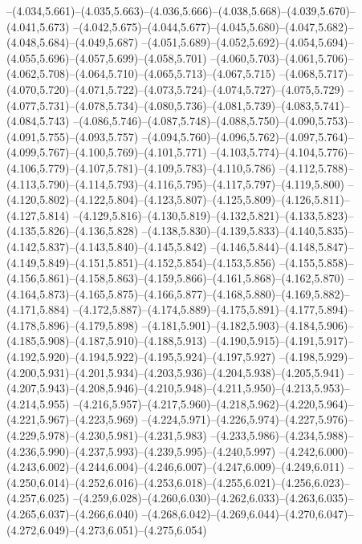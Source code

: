   --(4.034,5.661)--(4.035,5.663)--(4.036,5.666)--(4.038,5.668)--(4.039,5.670)--(4.041,5.673)%
  --(4.042,5.675)--(4.044,5.677)--(4.045,5.680)--(4.047,5.682)--(4.048,5.684)--(4.049,5.687)%
  --(4.051,5.689)--(4.052,5.692)--(4.054,5.694)--(4.055,5.696)--(4.057,5.699)--(4.058,5.701)%
  --(4.060,5.703)--(4.061,5.706)--(4.062,5.708)--(4.064,5.710)--(4.065,5.713)--(4.067,5.715)%
  --(4.068,5.717)--(4.070,5.720)--(4.071,5.722)--(4.073,5.724)--(4.074,5.727)--(4.075,5.729)%
  --(4.077,5.731)--(4.078,5.734)--(4.080,5.736)--(4.081,5.739)--(4.083,5.741)--(4.084,5.743)%
  --(4.086,5.746)--(4.087,5.748)--(4.088,5.750)--(4.090,5.753)--(4.091,5.755)--(4.093,5.757)%
  --(4.094,5.760)--(4.096,5.762)--(4.097,5.764)--(4.099,5.767)--(4.100,5.769)--(4.101,5.771)%
  --(4.103,5.774)--(4.104,5.776)--(4.106,5.779)--(4.107,5.781)--(4.109,5.783)--(4.110,5.786)%
  --(4.112,5.788)--(4.113,5.790)--(4.114,5.793)--(4.116,5.795)--(4.117,5.797)--(4.119,5.800)%
  --(4.120,5.802)--(4.122,5.804)--(4.123,5.807)--(4.125,5.809)--(4.126,5.811)--(4.127,5.814)%
  --(4.129,5.816)--(4.130,5.819)--(4.132,5.821)--(4.133,5.823)--(4.135,5.826)--(4.136,5.828)%
  --(4.138,5.830)--(4.139,5.833)--(4.140,5.835)--(4.142,5.837)--(4.143,5.840)--(4.145,5.842)%
  --(4.146,5.844)--(4.148,5.847)--(4.149,5.849)--(4.151,5.851)--(4.152,5.854)--(4.153,5.856)%
  --(4.155,5.858)--(4.156,5.861)--(4.158,5.863)--(4.159,5.866)--(4.161,5.868)--(4.162,5.870)%
  --(4.164,5.873)--(4.165,5.875)--(4.166,5.877)--(4.168,5.880)--(4.169,5.882)--(4.171,5.884)%
  --(4.172,5.887)--(4.174,5.889)--(4.175,5.891)--(4.177,5.894)--(4.178,5.896)--(4.179,5.898)%
  --(4.181,5.901)--(4.182,5.903)--(4.184,5.906)--(4.185,5.908)--(4.187,5.910)--(4.188,5.913)%
  --(4.190,5.915)--(4.191,5.917)--(4.192,5.920)--(4.194,5.922)--(4.195,5.924)--(4.197,5.927)%
  --(4.198,5.929)--(4.200,5.931)--(4.201,5.934)--(4.203,5.936)--(4.204,5.938)--(4.205,5.941)%
  --(4.207,5.943)--(4.208,5.946)--(4.210,5.948)--(4.211,5.950)--(4.213,5.953)--(4.214,5.955)%
  --(4.216,5.957)--(4.217,5.960)--(4.218,5.962)--(4.220,5.964)--(4.221,5.967)--(4.223,5.969)%
  --(4.224,5.971)--(4.226,5.974)--(4.227,5.976)--(4.229,5.978)--(4.230,5.981)--(4.231,5.983)%
  --(4.233,5.986)--(4.234,5.988)--(4.236,5.990)--(4.237,5.993)--(4.239,5.995)--(4.240,5.997)%
  --(4.242,6.000)--(4.243,6.002)--(4.244,6.004)--(4.246,6.007)--(4.247,6.009)--(4.249,6.011)%
  --(4.250,6.014)--(4.252,6.016)--(4.253,6.018)--(4.255,6.021)--(4.256,6.023)--(4.257,6.025)%
  --(4.259,6.028)--(4.260,6.030)--(4.262,6.033)--(4.263,6.035)--(4.265,6.037)--(4.266,6.040)%
  --(4.268,6.042)--(4.269,6.044)--(4.270,6.047)--(4.272,6.049)--(4.273,6.051)--(4.275,6.054)%
